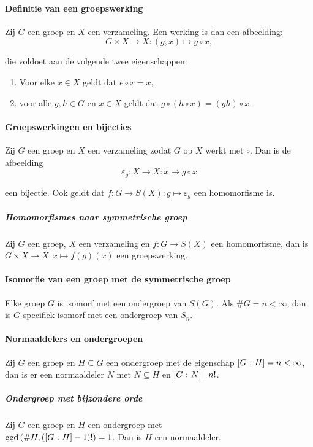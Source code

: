 \paragraph{Definitie van een groepswerking} Zij \(G\) een groep en \(X\) een verzameling. Een werking is dan een afbeelding:
\[
    G\times X\to X\colon (g,x)\mapsto g\circ x,
\]

die voldoet aan de volgende twee eigenschappen:
\begin{enumerate}
    \item Voor elke \(x\in X\) geldt dat \(e\circ x=x\),
    \item voor alle \(g,h\in G\) en \(x\in X\) geldt dat \(g\circ(h\circ x)=(gh)\circ x\).
\end{enumerate}

\paragraph{Groepswerkingen en bijecties} Zij \(G\) een groep en \(X\) een verzameling zodat \(G\) op \(X\) werkt met \(\circ\). Dan is de afbeelding
\[
    \varepsilon_{g}\colon X\to X\colon x\mapsto g\circ x
\]

een bijectie. Ook geldt dat \(f\colon G\to S(X)\colon g\mapsto\varepsilon_{g}\) een homomorfisme is.

\subparagraph{Homomorfismes naar symmetrische groep} Zij \(G\) een groep, \(X\) een verzameling en \(f\colon G\to S(X)\) een homomorfisme, dan is \(G\times X\to X\colon x\mapsto f(g)(x)\) een groepswerking.

\paragraph{Isomorfie van een groep met de symmetrische groep} Elke groep \(G\) is isomorf met een ondergroep van \(S(G)\). Als \(\#G=n<\infty\), dan is \(G\) specifiek isomorf met een ondergroep van \(S_{n}\).

\paragraph{Normaaldelers en ondergroepen} Zij \(G\) een groep en \(H\subseteq G\) een ondergroep met de eigenschap \(\left[G\>\colon H\right]=n<\infty\), dan is er een normaaldeler \(N\) met \(N\subseteq H\) en \(\left[G\>\colon N\right]\mid n!\).

\subparagraph{Ondergroep met bijzondere orde} Zij \(G\) een groep en \(H\) een ondergroep met \\\(\operatorname{ggd}\left(\#H,\left(\left[G\>\colon H\right]-1\right)!\right)=1\). Dan is \(H\) een normaaldeler.

